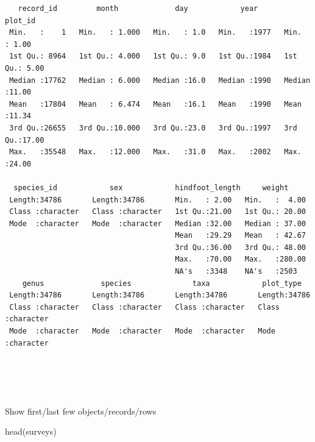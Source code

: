 \documentclass[
  letterpaper,
  DIV=11,
  numbers=noendperiod]{scrreprt}
\newenvironment{Shaded}{\begin{snugshade}}{\end{snugshade}}
\newcommand{\FunctionTok}[1]{\textcolor[rgb]{0.28,0.35,0.67}{#1}}
\newcommand{\NormalTok}[1]{\textcolor[rgb]{0.00,0.23,0.31}{#1}}
\begin{document}
\begin{verbatim}
   record_id         month             day            year         plot_id     
 Min.   :    1   Min.   : 1.000   Min.   : 1.0   Min.   :1977   Min.   : 1.00  
 1st Qu.: 8964   1st Qu.: 4.000   1st Qu.: 9.0   1st Qu.:1984   1st Qu.: 5.00  
 Median :17762   Median : 6.000   Median :16.0   Median :1990   Median :11.00  
 Mean   :17804   Mean   : 6.474   Mean   :16.1   Mean   :1990   Mean   :11.34  
 3rd Qu.:26655   3rd Qu.:10.000   3rd Qu.:23.0   3rd Qu.:1997   3rd Qu.:17.00  
 Max.   :35548   Max.   :12.000   Max.   :31.0   Max.   :2002   Max.   :24.00  
                                                                               
  species_id            sex            hindfoot_length     weight      
 Length:34786       Length:34786       Min.   : 2.00   Min.   :  4.00  
 Class :character   Class :character   1st Qu.:21.00   1st Qu.: 20.00  
 Mode  :character   Mode  :character   Median :32.00   Median : 37.00  
                                       Mean   :29.29   Mean   : 42.67  
                                       3rd Qu.:36.00   3rd Qu.: 48.00  
                                       Max.   :70.00   Max.   :280.00  
                                       NA's   :3348    NA's   :2503    
    genus             species              taxa            plot_type        
 Length:34786       Length:34786       Length:34786       Length:34786      
 Class :character   Class :character   Class :character   Class :character  
 Mode  :character   Mode  :character   Mode  :character   Mode  :character  
                                                                            
                                                                            
                                                                            
                                                                            
\end{verbatim}

Show first/last few objects/records/rows

\begin{Shaded}
\begin{Highlighting}[]
\FunctionTok{head}\NormalTok{(surveys)}
\end{Highlighting}
\end{Shaded}
\end{document}

